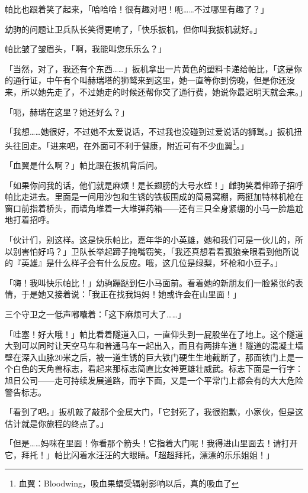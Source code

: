 帕比也跟着笑了起来，「哈哈哈！很有趣对吧！呃……不过哪里有趣了？」

幼驹的问题让卫兵队长笑得更响了，「快乐扳机，但你叫我扳机就好。」

帕比皱了皱眉头，「啊，我能叫您乐乐么？」

「当然，对了，我还有个东西……」扳机拿出一片黄色的塑料卡递给帕比，「这是你的通行证，中午有个叫赫瑞塔的狮鹫来到这里，她一直等你到傍晚，但是你还没来，所以她先走了，不过她走的时候还帮你交了通行费，她说你最迟明天就会来。」

「呃，赫瑞在这里？她还好么？」

「我想……她很好，不过她不太爱说话，不过我也没碰到过爱说话的狮鹫。」扳机扭头往回走。「进来吧，在外面可不利于健康，附近可有不少血翼\footnote{血翼：Bloodwing，吸血果蝠受辐射影响以后，真的吸血了}。」

「血翼是什么啊？」帕比跟在扳机背后问。

「如果你问我的话，他们就是麻烦！是长翅膀的大号水蛭！」雌驹笑着伸蹄子招呼帕比走进去。里面是一间用沙包和生锈的铁板围成的简易窝棚，两挺加特林机枪在窗口前指着桥头，而墙角堆着一大堆弹药箱——还有三只全身紧绷的小马一脸尴尬地打着招呼。

「伙计们，别这样。这是快乐帕比，嘉年华的小英雄，她和我们可是一伙儿的，所以别害怕好吗？」卫队长举起蹄子掩嘴窃笑，「我还真想看看孤狼亲眼看到他所说的『英雄』是什么样子会有什么反应。哦，这几位是绿梨，坏枪和小豆子。」

「嗨！我叫快乐帕比！」幼驹蹦跶到仨小马面前。看着她的新朋友们一脸紧张的表情，于是她又接着说：「我正在找我妈妈！她或许会在山里面！」

三个守卫之一低声嘟囔着：「这下麻烦可大了……」

\horizonline


「哇塞！好大哦！」帕比看着隧道入口，一直仰头到一屁股坐在了地上。这个隧道大到可以同时让天空马车和普通马车一起出入，而且有两排车道！隧道的混凝土墙壁在深入山脉20米之后，被一道生锈的巨大铁门硬生生地截断了，那面铁门上是一个白色的天角兽标志，看起来那标志简直比女神更雄壮威武。标志下面是一行字：旭日公司——走可持续发展道路，而字下面，又是一个平常门上都会有的大大危险警告标志。

「看到了吧。」扳机敲了敲那个金属大门，「它封死了，我很抱歉，小家伙，但是这估计就是你旅程的终点了。」

「但是……妈咪在里面！你看那个箭头！它指着大门呢！我得进山里面去！请打开它，拜托！」帕比闪着水汪汪的大眼睛。「超超拜托，漂漂的乐乐姐姐！」

